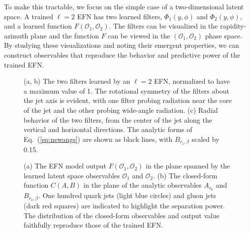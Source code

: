 \documentclass[letterpaper,11pt]{article}
\DeclareRobustCommand{\Eq}[1]{Eq.~(\ref{#1})}
\begin{document}
To make this tractable, we focus on the simple case of a two-dimensional latent space.
%
A trained $\ell=2$ EFN has two learned filters, $\Phi_1(y,\phi)$ and $\Phi_2(y,\phi)$, and a learned function $F(\mathcal O_1, \mathcal O_2)$.
%
The filters can be visualized in the rapidity-azimuth plane and the function $F$ can be viewed in the $(\mathcal O_1,\mathcal O_2)$ phase space.
%
By studying these visualizations and noting their emergent properties, we can construct observables that reproduce the behavior and predictive power of the trained EFN.


\begin{figure}[t]
\centering
{}

\caption{(a, b) The two filters learned by an $\ell=2$ EFN, normalized to have a maximum value of 1.
%
The rotational symmetry of the filters about the jet axis is evident, with one filter probing radiation near the core of the jet and the other probing wide-angle radiation.
%
(c) Radial behavior of the two filters, from the center of the jet along the vertical and horizontal directions.
%
The analytic forms of \Eq{eq:newangs} are shown as black lines, with $B_{r_1,\beta}$ scaled by 0.15.
}
\label{fig:learnedEFN2}
\end{figure}



\begin{figure}[t]
\centering
{}
\caption{
%
(a) The EFN model output $F(\mathcal O_1,\mathcal O_2)$ in the plane spanned by the learned latent space observables $\mathcal O_1$ and $\mathcal O_2$.
%
(b) The closed-form function $C(A,B)$ in the plane of the analytic observables $A_{r_0}$ and $B_{r_1,\beta}$.
%
One hundred quark jets (light blue circles) and gluon jets (dark red squares) are indicated to highlight the separation power.
%
The distribution of the closed-form observables and output value faithfully reproduce those of the trained EFN.}
\label{fig:learnedEFN2radial}
\end{figure}
\end{document}
